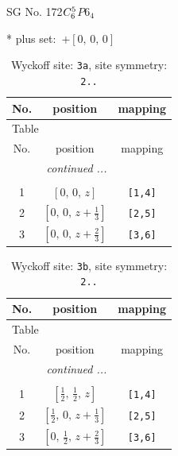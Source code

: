 \documentclass[fleqn,8pt]{jsarticle}
\begin{document}
\setcounter{MaxMatrixCols}{32}

\renewcommand{\tablename}{Table~}
\renewcommand{\figurename}{Figure~}
\begin{center}
\LARGE
SG No. 172\quad$C_{\rm 6}^{5}$\quad$P6_4$\quad[ hexagonal ]
\end{center}
* plus set:\,\,\,$+\left[ 0,\, 0,\, 0 \right]$
\renewcommand{\arraystretch}{1.2}
\begin{longtable}{ccc}
\caption{Wyckoff site: {\tt 3a}, site symmetry: {\tt 2..}}
 \\
 \hline \hline
No. & position & mapping \\ \hline \endfirsthead

\multicolumn{2}{l}{\tablename\ \thetable{}} \\
 \hline \hline
No. & position & mapping \\ \hline \endhead

 \hline \hline
\multicolumn{2}{r}{\footnotesize\it continued ...} \\ \endfoot

 \hline \hline
\multicolumn{2}{r}{} \\ \endlastfoot

1 & $\left[ 0,\, 0,\, z \right]$ & {\tt [1,4]} \\ \hline
2 & $\left[ 0,\, 0,\, z + \frac{1}{3} \right]$ & {\tt [2,5]} \\ \hline
3 & $\left[ 0,\, 0,\, z + \frac{2}{3} \right]$ & {\tt [3,6]} \\
\end{longtable}
\renewcommand{\arraystretch}{1.2}
\begin{longtable}{ccc}
\caption{Wyckoff site: {\tt 3b}, site symmetry: {\tt 2..}}
 \\
 \hline \hline
No. & position & mapping \\ \hline \endfirsthead

\multicolumn{2}{l}{\tablename\ \thetable{}} \\
 \hline \hline
No. & position & mapping \\ \hline \endhead

 \hline \hline
\multicolumn{2}{r}{\footnotesize\it continued ...} \\ \endfoot

 \hline \hline
\multicolumn{2}{r}{} \\ \endlastfoot

1 & $\left[ \frac{1}{2},\, \frac{1}{2},\, z \right]$ & {\tt [1,4]} \\ \hline
2 & $\left[ \frac{1}{2},\, 0,\, z + \frac{1}{3} \right]$ & {\tt [2,5]} \\ \hline
3 & $\left[ 0,\, \frac{1}{2},\, z + \frac{2}{3} \right]$ & {\tt [3,6]} \\
\end{longtable}
\end{document}
